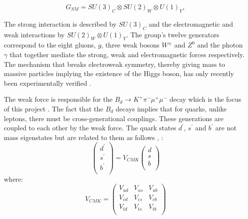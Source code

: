 \documentclass[a4paper,12pt]{article}
\begin{document}
\begin{equation}\label{SM}
G_{SM} = SU(3)_C \otimes SU(2)_W \otimes U(1)_Y,
\end{equation}

The strong interaction is described by $SU(3)_C$ and the electromagnetic and weak interactions by $SU(2)_W \otimes U(1)_Y$. The group's twelve generators correspond to the eight gluons, $g$, three weak bosons $W^\pm$ and $Z^0$ and the photon $\gamma$ that together mediate the strong, weak and electromagnetic forces respectively\cite[p. 13]{paper1}. 
The mechanism that breaks electroweak symmetry, thereby giving mass to massive particles implying the existence of the Higgs boson, has only recently been experimentally verified \cite{paper33}. 

The weak force is responsible for the $B_d  \rightarrow K^+  \pi^-\mu^+\mu^-$ decay which is the focus of this project \cite[p. 21]{paper1}. 
The fact that the $B_d$ decays implies that for quarks, unlike leptons,  there must be cross-generational couplings. These generations are coupled to each other by the weak force. The quark states $d^{\prime}$, $s^{\prime}$ and $b^{\prime}$ are not mass eigenstates but are related to them as follows \cite[p. 414]{riazuddin}, \cite{paper29, paper30}: 
\begin{equation}
\begin{pmatrix} d^{\prime} \\ 
                         s^{\prime}\\
                         b^{\prime}\\
\end{pmatrix}
= V_{CMK}  \begin{pmatrix} d \\ 
                         s\\
                         b\\
\end{pmatrix}
\end{equation}
where: 
\begin{equation}
V_{CMK} = \begin{pmatrix} V_{ud}& V_{us}& V_{ub}\\
                                           V_{cd} &V_{cs} &V_{cb} \\
V_{td} &V_{ts}& V_{tb} \\
\end{pmatrix}
\end{equation}
\end{document}
